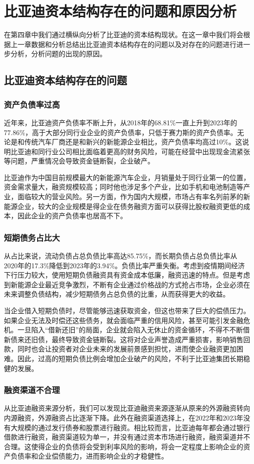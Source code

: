 \chapter{比亚迪资本结构存在的问题和原因分析}
在第四章中我们通过横纵向分析了比亚迪的资本结构现状。在这一章中我们将会根据上一章数据和分析总结出比亚迪资本结构存在的问题以及对存在的问题进行进一步分析，分析问题的出现的原因。 
\section{比亚迪资本结构存在的问题}

\subsection{资产负债率过高}
近年来，比亚迪资产负债率不断上升，从2018年的68.81\%一直上升到2023年的77.86\%，高于大部分同行业企业的资产负债率，只低于赛力斯的资产负债率。无论是和传统汽车厂商还是和新兴的新能源企业相比，资产负债率均高过10\%。这说明比亚迪和同行业公司相比面临着更高的财务风险，可能在经营中出现现金流紧张等问题，严重情况会导致资金链断裂，企业破产。

比亚迪作为中国目前规模最大的新能源汽车企业，月销量处于同行业第一的位置，资金需求量大，融资规模较高；同时他也涉足多个产业，比如手机和电池制造等产业，面临较大的营业风险。另一方面，作为国内大规模，市场占有率名列前茅的新能源企业，较大的企业规模是得企业在债务融资方面可以获得比股权融资更低的成本，因此企业的资产负债率也居高不下。
\subsection{短期债务占比大}
从占比来说，流动负债占总负债比率高达85.75\%，而长期负债占总负债比率从2020年的17.3\%降低到2023年的3.94\%。负债比率严重失衡。考虑到疫情期间经济下行压力较大，使用短期负债融资具有资金成本低廉，融资迅速的特点。但是考虑到新能源企业最近竞争激烈，不断有企业通过价格战的方式抢占市场，企业必须在未来调整负债结构，减少短期债务占总负债的比重，从而获得更大的收益。

当企业借入短期负债时，尽管能够迅速获取资金，但这也带来了巨大的偿债压力。如果企业无法及时偿还这些债务，就会面临严重的信用风险，甚至可能引发金融危机。一旦陷入“借新还旧”的局面，企业就会陷入无休止的资金循环，不得不不断借新债来还旧债，最终导致资金链断裂。这将对企业声誉造成严重损害，影响销售回款，同时也会让投资者对企业未来的发展前景感到担忧，进而使企业融资更加困难。因此，过高的短期负债比例会增加企业破产的风险，不利于比亚迪集团长期稳健的发展。
\subsection{融资渠道不合理}
从比亚迪融资来源分析，我们可以发现比亚迪融资来源逐渐从原来的外源融资转向内源融资，外源融资占比逐渐下降。此外在融资渠道选择上，在2022年和2023年没有大规模的通过发行债券和股票进行融资。相比较而言，比亚迪每年都会通过银行借款进行融资，融资渠道较为单一，并没有通过资本市场进行融资，融资渠道并不合理。这使得企业的负债将会受到利率风险的影响，将会一定程度上影响企业的资产负债率和企业偿债能力，进而影响企业的才稳健性。


